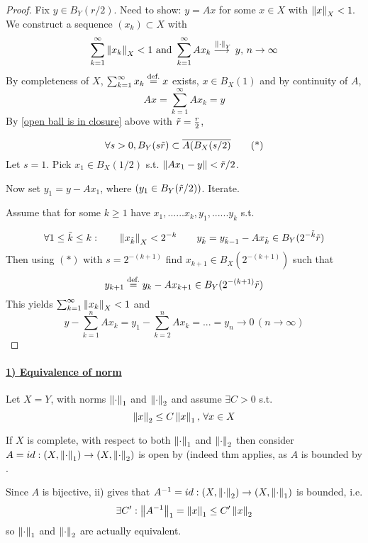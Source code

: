 \documentclass{article}
\begin{document}
\begin{proof}
Fix $y\in B_Y(r/2)$. Need to show: $y=Ax$ for some $x\in X$ with $\left\|{x}\right\|_X<1.$\\
We construct a sequence $(x_k)\subset X$ with 
$$
\sum_{k=1}^\infty \left\|{x_k}\right\|_X<1\,\,\text{and}\,\,\sum_{k=1}^\infty Ax_k\stackrel{\left\|{\cdot}\right\|_Y}{\longrightarrow{}}y,\,n\to\infty
$$
By completeness of $X$, $\sum_{k=1}^\infty x_k\stackrel{\text{def.}}{=} x$ exists, $x\in B_X(1)$ and by continuity of $A$,
$$Ax=\sum_{k=1}^\infty Ax_k=y$$
By \cref{open ball is in closure} above with $\Tilde{r}=\frac{r}{2}$,  

\begin{equation*}
    \forall s>0, B_Y(s\Tilde{r})\subset \overline{A(B_X(s/2)}
    \tag{*}
\end{equation*}
Let $s=1$. Pick $x_1\in B_X(1/2)$ s.t. $\left\|{Ax_1-y}\right\|<\Tilde{r}/2$. 

Now set $y_1=y-Ax_1$, where $(y_1 \in B_Y(\Tilde{r}/2))$. Iterate.  

Assume that for some $k \geq 1$ have $x_1,......x_k,y_1,......y_k$ s.t.

$$
\forall 1\leq\tilde{k}\leq k:\qquad \left\|{x_{\Tilde{k}}}\right\|_X < 2^{-k}\qquad y_{\tilde{k}}=y_{\tilde{k}-1}-Ax_{\tilde{k}}\in B_Y(2^{-\Tilde{k}}\Tilde{r})
$$
Then using $(*)$ with $s=2^{-(k+1)}$ find $x_{k+1}\in B_X(2^{-(k+1)})$ such that
$$
y_{k+1}\stackrel{\text{def.}}{=} y_k-Ax_{k+1}\in B_Y(2^{-(k+1)}\Tilde{r})
$$
This yields $\sum_{k=1}^{\infty}\left\|{x_k}\right\|_X<1$ and 
$$
y-\sum_{k=1}^n Ax_k=y_1-\sum_{k=2}^n Ax_k=...=y_n\to0\,(n\to \infty)
$$
\end{proof}

\paragraph{\underline{\textbf{1) Equivalence of norm}}}

\begin{example}\nl
Let $X=Y$, with norms $\left\|{\cdot}\right\|_1$ and $\left\|{\cdot}\right\|_2$ and assume $\exists C>0$ s.t.
\begin{equation}
\label{equivalence of norm example}
    \left\|{x}\right\|_2\leq C\left\|{x}\right\|_1,\,\forall x\in X
\end{equation}

If $X$ is complete, with respect to both $\left\|{\cdot}\right\|_1$ and $\left\|{\cdot}\right\|_2$ then consider $A=id:(X,\left\|{\cdot}\right\|_1)\to(X,\left\|{\cdot}\right\|_2)$ is open by  (indeed thm applies, as $A$ is bounded by . 

Since $A$ is bijective, ii) gives that $A^{-1}=id:(X,\left\|{\cdot}\right\|_2)\to(X,\left\|{\cdot}\right\|_1)$ is bounded, i.e.
$$
\exists C': \left\|{A^{-1}}\right\|_1=\left\|{x}\right\|_1\leq C'\left\|{x}\right\|_2
$$
so $\left\|{\cdot}\right\|_1$ and $\left\|{\cdot}\right\|_2$ are actually equivalent.
\end{example}
\end{document}
